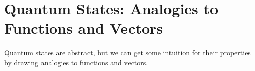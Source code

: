 %
%
%
%

\section*{Quantum States: Analogies to Functions and Vectors}

	Quantum states are abstract, but we can get some intuition for their properties by drawing analogies to functions and vectors.

